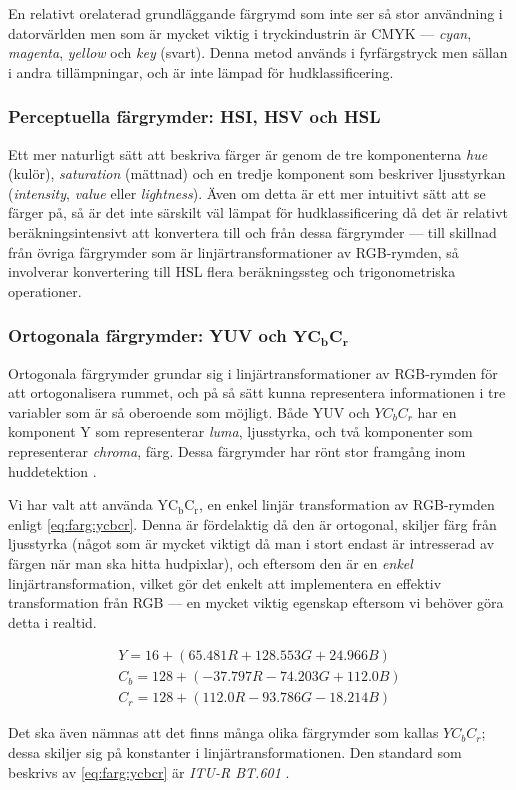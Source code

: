 \documentclass[../rapport_MVEX01-11-05]{subfiles}
\begin{document}
En relativt orelaterad grundläggande färgrymd som inte ser så stor
användning i datorvärlden men som är mycket viktig i tryckindustrin är
CMYK --- \emph{cyan}, \emph{magenta}, \emph{yellow} och \emph{key}
(svart). Denna metod används i fyrfärgstryck men sällan i andra
tillämpningar, och är inte lämpad för hudklassificering.

\subsubsection{Perceptuella färgrymder: HSI, HSV och HSL}

Ett mer naturligt sätt att beskriva färger är genom de tre
komponenterna \emph{hue} (kulör), \emph{saturation} (mättnad) och en
tredje komponent som beskriver ljusstyrkan (\emph{intensity},
\emph{value} eller \emph{lightness}). Även om detta är ett mer
intuitivt sätt att se färger på, så är det inte särskilt väl lämpat
för hudklassificering då det är relativt beräkningsintensivt att
konvertera till och från dessa färgrymder --- till skillnad från
övriga färgrymder som är linjärtransformationer av RGB-rymden, så
involverar konvertering till HSL flera beräkningssteg och
trigonometriska operationer.

\subsubsection[Ortogonala färgrymder: YUV och $\mathrm{YC_bC_r}$]{Ortogonala färgrymder: YUV och $\mathbf{YC_bC_r}$}

Ortogonala färgrymder grundar sig i linjärtransformationer av
RGB-rymden för att ortogonalisera rummet, och på så sätt kunna
representera informationen i tre variabler som är så oberoende som
möjligt. Både YUV och $YC_bC_r$ har en komponent Y som representerar
\emph{luma}, ljusstyrka, och två komponenter som representerar
\emph{chroma}, färg. Dessa färgrymder har rönt stor framgång inom
huddetektion \cite{Hsu02,Elmezain08,Hassanpour08}.

Vi har valt att använda $\mathrm{YC_bC_r}$, en enkel linjär transformation av
RGB-rymden enligt \eqref{eq:farg:ycbcr}. Denna är fördelaktig då den
är ortogonal, skiljer färg från ljusstyrka (något
som är mycket viktigt då man i stort endast är intresserad av färgen
när man ska hitta hudpixlar), och eftersom den är en \emph{enkel}
linjärtransformation, vilket gör det enkelt att implementera en
effektiv transformation från RGB --- en mycket viktig egenskap eftersom vi
behöver göra detta i realtid.

\begin{equation}
  \label{eq:farg:ycbcr}
  \begin{gathered}
  Y   = 16  + ( 65.481R + 128.553G + 24.966B)\\
  C_b = 128 + (-37.797R - 74.203G  + 112.0B )\\
  C_r = 128 + (112.0R   - 93.786G  - 18.214B)
  \end{gathered}
\end{equation}

Det ska även nämnas att det finns många olika färgrymder som kallas
$YC_bC_r$; dessa skiljer sig på konstanter i linjärtransformationen.
Den standard som beskrivs av \eqref{eq:farg:ycbcr} är \emph{ITU-R
BT.601} .
\end{document}
